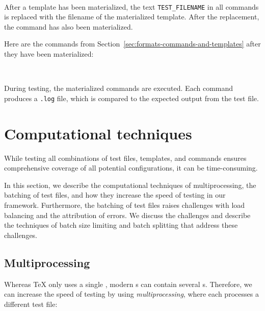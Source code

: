 \documentclass[final]{ltugboat}
\begin{document}
\medskip
\noindent
{} \\[0.4em]

\medskip
\exampleSeparator

\medskip
\noindent
{}

\medskip

After a template has been materialized, the text \texttt{TEST\_FILENAME} in all commands is replaced with the filename of the materialized template. After the replacement, the command has also been materialized.

Here are the commands  from Section~\ref{sec:formats-commands-and-templates} after they have been materialized:

\smallskip
\noindent
{} \\[0.8em]

\smallskip

\noindent
During testing, the materialized commands are executed. Each command produces a \texttt{.log} file, which is compared to the expected output from the test file.

\section{Computational techniques}
\label{sec:computational-techniques}

While testing all combinations of test files, templates, and commands ensures comprehensive coverage of all potential configurations, it can be time-consuming.

In this section, we describe the computational techniques of multiprocessing, the batching of test files, and how they increase the speed of testing in our framework.
Furthermore, the batching of test files raises challenges with load balancing and the attribution of errors. We discuss the challenges and describe the techniques of batch size limiting and batch splitting that address these challenges.

\subsection{Multiprocessing}
\label{sec:multiprocessing}
Whereas \TeX{} only uses a single , modern s can contain several s. Therefore, we can increase the speed of testing by using \emph{multiprocessing}, where each  processes a different test file:
\end{document}
